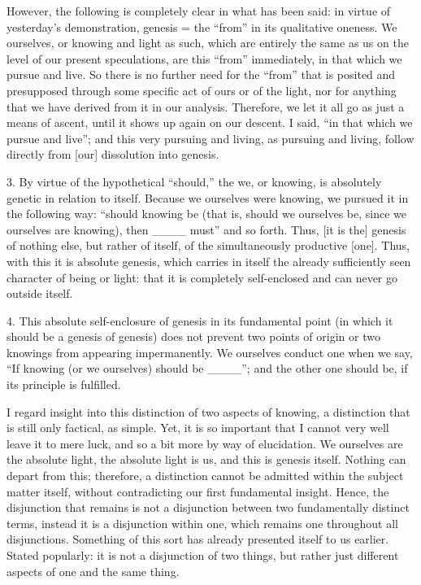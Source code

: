 However, the following is
completely clear in what has been said:
in virtue of yesterday's demonstration,
genesis = the “from” in its qualitative oneness.
We ourselves, or knowing and light as such,
which are entirely the same as us
on the level of our present speculations,
are this “from” immediately,
in that which we pursue and live.
So there is no further need for the “from”
that is posited and presupposed through
some specific act of ours or of the light,
nor for anything that we have derived from it in our analysis.
Therefore, we let it all go as just a means of ascent,
until it shows up again on our descent.
I said, “in that which we pursue and live”;
and this very pursuing and living,
as pursuing and living,
follow directly from [our] dissolution into genesis.

3.  By virtue of the hypothetical “should,”
the we, or knowing, is absolutely genetic
in relation to itself.
Because we ourselves were knowing,
we pursued it in the following way:
“should knowing be
(that is, should we ourselves be,
since we ourselves are knowing),
then ____ must” and so forth.
Thus, [it is the] genesis of nothing else,
but rather of itself,
of the simultaneously productive [one].
Thus, with this it is absolute genesis,
which carries in itself the already sufficiently
seen character of being or light:
that it is completely self-enclosed
and can never go outside itself.

4. This absolute self-enclosure
of genesis in its fundamental point
(in which it should be a genesis of genesis)
does not prevent two points of origin
or two knowings from appearing impermanently.
We ourselves conduct one when we say,
“If knowing (or we ourselves) should be ____”;
and the other one should be,
if its principle is fulfilled.

I regard insight into this distinction of two aspects of knowing,
a distinction that is still only factical, as simple.
Yet, it is so important that I cannot
very well leave it to mere luck,
and so a bit more by way of elucidation.
We ourselves are the absolute light,
the absolute light is us,
and this is genesis itself.
Nothing can depart from this;
therefore, a distinction cannot be admitted
within the subject matter itself,
without contradicting our first fundamental insight.
Hence, the disjunction that remains is not
a disjunction between two fundamentally distinct terms,
instead it is a disjunction within one,
which remains one throughout all disjunctions.
Something of this sort has already presented itself to us earlier.
Stated popularly: it is not a disjunction of two things,
but rather just different aspects of one and the same thing.

